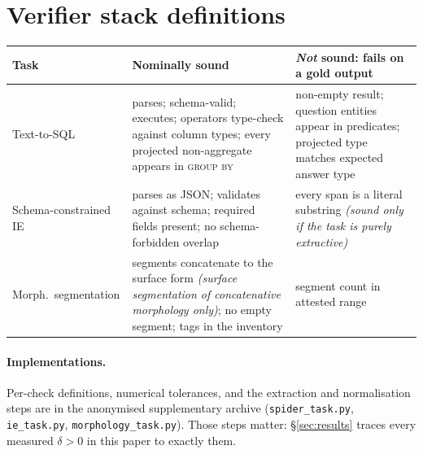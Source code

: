 \documentclass[11pt]{article}
\begin{document}
\section{Verifier stack definitions}\label{app:checks}
\begin{table}[!htbp]\centering\small
\setlength{\tabcolsep}{3pt}
\begin{tabular}{@{}p{1.55cm}p{3.05cm}p{2.15cm}@{}}
\toprule
Task & Nominally sound & \emph{Not} sound: fails on a gold output \\
\midrule
Text-to-SQL & parses; schema-valid; executes; operators type-check against column types; every projected non-aggregate appears in \textsc{group by} & non-empty result; question entities appear in predicates; projected type matches expected answer type \\[2pt]
Schema-con\-strained IE & parses as JSON; validates against schema; required fields present; no schema-forbidden overlap & every span is a literal substring \emph{(sound only if the task is purely extractive)} \\[2pt]
Morph.\ segmentation & segments concatenate to the surface form \emph{(surface segmentation of concatenative morphology only)}; no empty segment; tags in the inventory & segment count in attested range \\
\bottomrule
\end{tabular}
\label{tab:stacks}
\end{table}

\paragraph{Implementations.} Per-check definitions, numerical tolerances, and the extraction and normalisation steps are in the anonymised supplementary archive (\texttt{spider\_task.py}, \texttt{ie\_task.py}, \texttt{morphology\_task.py}). Those steps matter: \S\ref{sec:results} traces every measured $\delta>0$ in this paper to exactly them.
\end{document}
